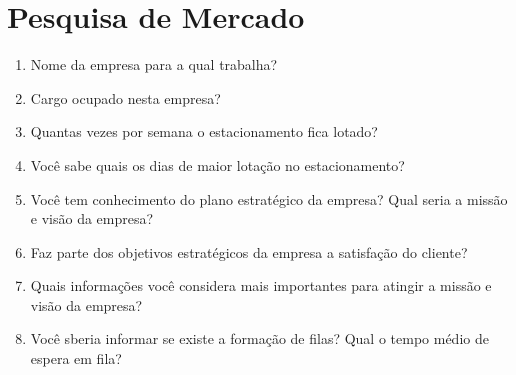 \chapter{Pesquisa de Mercado}

\begin{enumerate}
\item Nome da empresa para a qual trabalha?
\item Cargo ocupado nesta empresa?
\item Quantas vezes por semana o estacionamento fica lotado?
\item Você sabe quais os dias de maior lotação no estacionamento?
\item Você tem conhecimento do plano estratégico da empresa? Qual seria a missão e visão da empresa?
\item Faz parte dos objetivos estratégicos da empresa a satisfação do cliente?
\item Quais informações você considera mais importantes para atingir a missão e visão da empresa?
\item Você sberia informar se existe a formação de filas? Qual o tempo médio de espera em fila? 
\end{enumerate}

